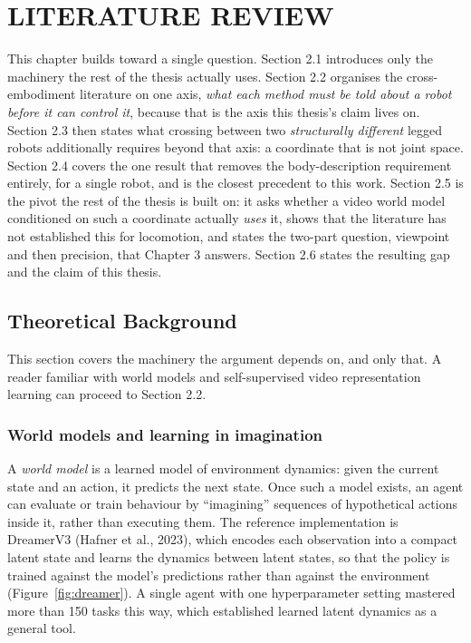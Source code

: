 \documentclass[12pt,a4paper,oneside]{report}
\begin{document}
\chapter{LITERATURE REVIEW}

This chapter builds toward a single question. Section 2.1 introduces only the machinery the rest of
the thesis actually uses. Section 2.2 organises the cross-embodiment literature on one axis,
\emph{what each method must be told about a robot before it can control it}, because that is the
axis this thesis's claim lives on. Section 2.3 then states what crossing between two
\emph{structurally different} legged robots additionally requires beyond that axis: a coordinate
that is not joint space. Section 2.4 covers the one result that removes the body-description
requirement entirely, for a single robot, and is the closest precedent to this work. Section 2.5 is
the pivot the rest of the thesis is built on: it asks whether a video world model conditioned on such
a coordinate actually \emph{uses} it, shows that the literature has not established this for
locomotion, and states the two-part question, viewpoint and then precision, that Chapter 3 answers.
Section 2.6 states the resulting gap and the claim of this thesis.

\section{Theoretical Background}
This section covers the machinery the argument depends on, and only that. A reader familiar with
world models and self-supervised video representation learning can proceed to Section 2.2.

\subsection{World models and learning in imagination}
A \emph{world model} is a learned model of environment dynamics: given the current state and an
action, it predicts the next state. Once such a model exists, an agent can evaluate or train
behaviour by ``imagining'' sequences of hypothetical actions inside it, rather than executing them.
The reference implementation is DreamerV3 (Hafner et al., 2023), which encodes each observation into
a compact latent state and learns the dynamics between latent states, so that the policy is trained
against the model's predictions rather than against the environment (Figure~\ref{fig:dreamer}). A
single agent with one hyperparameter setting mastered more than 150 tasks this way, which
established learned latent dynamics as a general tool.
\end{document}
